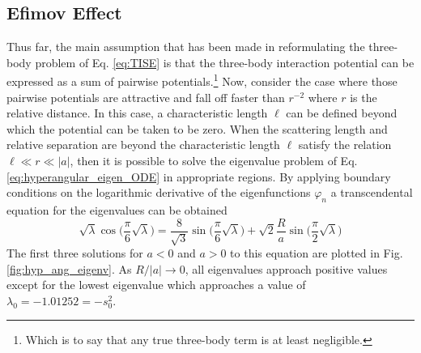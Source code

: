 \documentclass[prl,onecolumn,amsmath,amssymb,titlepage,nofootinbib,preprint]{revtex4-1}
\begin{document}
 \subsection{Efimov Effect}
	Thus far, the main assumption that has been made in reformulating the three-body problem of Eq. \ref{eq:TISE} is that the three-body interaction potential can be expressed as a sum of pairwise potentials.\footnote{Which is to say that any true three-body term is at least negligible.}  Now, consider the case where those pairwise potentials are attractive and fall off faster than $r^{-2}$ where $r$ is the relative distance.  In this case, a characteristic length $\ell$ can be defined beyond which the potential can be taken to be zero.  When the scattering length and relative separation are beyond the characteristic length $\ell$ satisfy the relation $\ell\ll r \ll |a|$, then it is possible to solve the eigenvalue problem of Eq. \ref{eq:hyperangular_eigen_ODE} in appropriate regions.  By applying boundary conditions on the logarithmic derivative of the eigenfunctions $\varphi_{n}$ a transcendental equation for the eigenvalues can be obtained \cite{Efimov1971}\cite{Braaten_2006}\cite{Fedorov1993}
	\begin{equation}\label{eq:channel_eigenvalue_eq}
		\sqrt{\lambda}\cos\bigg(\frac{\pi}{6}\sqrt{\lambda}\bigg)=\frac{8}{\sqrt{3}}\sin\bigg(\frac{\pi}{6}\sqrt{\lambda}\bigg)+\sqrt{2}\frac{R}{a}\sin\bigg(\frac{\pi}{2}\sqrt{\lambda}\bigg)
	\end{equation}
	The first three solutions for $a<0$ and $a>0$ to this equation are plotted in Fig. \ref{fig:hyp_ang_eigenv}. As $R/|a|\rightarrow0$, all eigenvalues approach positive values except for the lowest eigenvalue which approaches a value of $\lambda_{0}=-1.01252=-s_{0}^{2}$.  
	
\end{document}
